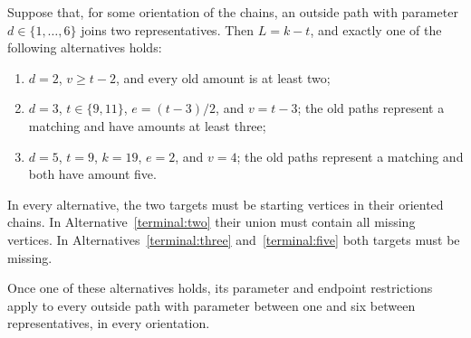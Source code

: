 \begin{lemma}\label{terminal:classification}
Suppose that, for some orientation of the chains, an outside path with
parameter \(d\in\{1,\ldots,6\}\) joins two representatives.
Then \(L=k-t\), and exactly one of the following alternatives holds:
\begin{enumerate}
 \item\label{terminal:two}
 \(d=2\), \(v\ge t-2\), and every old amount is at least two;
 \item\label{terminal:three}
 \(d=3\), \(t\in\{9,11\}\), \(e=(t-3)/2\), and \(v=t-3\);
 the old paths represent a matching and have amounts at least three;
 \item\label{terminal:five}
 \(d=5\), \(t=9\), \(k=19\), \(e=2\), and \(v=4\);
 the old paths represent a matching and both have amount five.
\end{enumerate}
In every alternative, the two targets must be starting vertices in their
oriented chains.  In Alternative~\ref{terminal:two} their union must contain
all missing vertices.  In Alternatives~\ref{terminal:three}
and~\ref{terminal:five} both targets must be missing.

Once one of these alternatives holds, its parameter and endpoint
restrictions apply to every outside path with parameter between one and six
between representatives, in every orientation.
\end{lemma}

